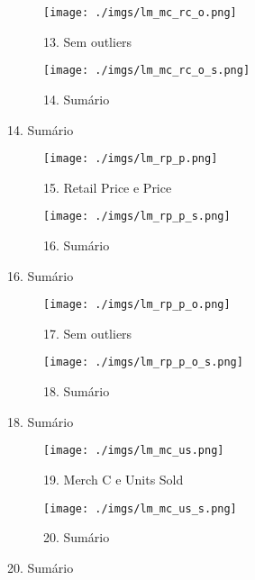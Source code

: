 \documentclass[12pt, a4paper]{article}
\begin{document}
\FloatBarrier
\begin{figure}[h]
  \begin{subfigure}[b]{0.4\textwidth}
    \texttt{[image: ./imgs/lm\_mc\_rc\_o.png]}
    \caption*{13. Sem outliers}
    \label{fig:1}
  \end{subfigure}
  \begin{subfigure}[b]{0.5\textwidth}
    \texttt{[image: ./imgs/lm\_mc\_rc\_o\_s.png]}
    \caption*{14. Sumário}
    \label{fig:2}
  \end{subfigure}
\end{figure}
\FloatBarrier 

\FloatBarrier
\begin{figure}[h]
  \hspace{1cm}
  \begin{subfigure}[b]{0.48\textwidth}
    \texttt{[image: ./imgs/lm\_rp\_p.png]}
    \caption*{15. Retail Price e Price}
    \label{fig:1}
  \end{subfigure}
  \begin{subfigure}[b]{0.5\textwidth}
    \texttt{[image: ./imgs/lm\_rp\_p\_s.png]}
    \caption*{16. Sumário}
    \label{fig:2}
  \end{subfigure}
\end{figure}
\FloatBarrier 

\FloatBarrier
\begin{figure}[h]
  \hspace{1.2cm}
  \begin{subfigure}[b]{0.4\textwidth}
    \texttt{[image: ./imgs/lm\_rp\_p\_o.png]}
    \caption*{17. Sem outliers}
    \label{fig:1}
  \end{subfigure}
    \hspace{0.4cm}
  \begin{subfigure}[b]{0.5\textwidth}
    \texttt{[image: ./imgs/lm\_rp\_p\_o\_s.png]}
    \caption*{18. Sumário}
    \label{fig:2}
  \end{subfigure}
\end{figure}
\FloatBarrier 

\FloatBarrier
\begin{figure}[h]
  \begin{subfigure}[b]{0.4\textwidth}
    \texttt{[image: ./imgs/lm\_mc\_us.png]}
    \caption*{19. Merch C e Units Sold}
    \label{fig:1}
  \end{subfigure}
  \begin{subfigure}[b]{0.5\textwidth}
    \texttt{[image: ./imgs/lm\_mc\_us\_s.png]}
    \caption*{20. Sumário}
    \label{fig:2}
  \end{subfigure}
\end{figure}
\FloatBarrier 
\end{document}
